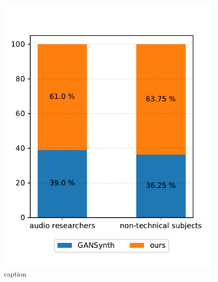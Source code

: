 \begin{figure}[t]
    \centering
    \includegraphics[width=0.8\linewidth]{assets/figures/quality_result.pdf}
    \caption{caption}
    \label{fig:quality_result}
\end{figure}